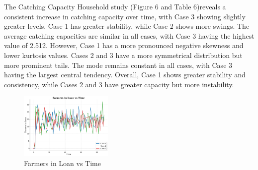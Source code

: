 \documentclass[final,5p,times,twocolumn,authoryear]{elsarticle}
\begin{document}
The Catching Capacity Household study (Figure 6 and Table 6)reveals a consistent increase in catching capacity over time, with Case 3 showing slightly greater levels. Case 1 has greater stability, while Case 2 shows more swings. The average catching capacities are similar in all cases, with Case 3 having the highest value of 2.512. However, Case 1 has a more pronounced negative skewness and lower kurtosis values. Cases 2 and 3 have a more symmetrical distribution but more prominent tails. The mode remains constant in all cases, with Case 3 having the largest central tendency. Overall, Case 1 shows greater stability and consistency, while Cases 2 and 3 have greater capacity but more instability.\\
\begin{figure}[htbp]
    \centering
    \includegraphics[width=0.4\textwidth]{graph_all/plots_fav/farmers_in_loan_vs_time.png}
    \caption{Farmers in Loan vs Time}
    \label{fig:farmers_loan}
\end{figure}
\begin{table}[htbp]
    \centering
    \caption{Farmers in Loan - Statistical Analysis}
\end{table}
\end{document}
